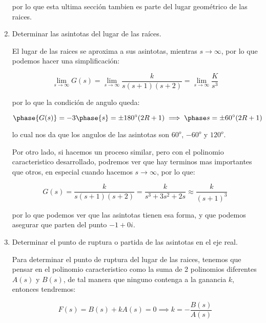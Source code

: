 \begin{enumerate}
		por lo que esta ultima sección tambien es parte del lugar geométrico de las raices.


		\item Determinar las asintotas del lugar de las raíces.

		El lugar de las raices se aproxima a sus asintotas, mientras $s \to \infty$, por lo que podemos hacer una simplificación:

		\begin{equation*}
			\lim_{s \to \infty} G(s) = \lim_{s \to \infty} \frac{k}{s(s+1)(s+2)} = \lim_{s \to \infty} \frac{K}{s^3}
		\end{equation*}

		por lo que la condición de angulo queda:

		\begin{equation*}
			\phase{G(s)} = -3 \phase{s} = \pm 180^{\circ} (2R + 1) \implies \phase s = \pm 60^{\circ} (2R + 1)
		\end{equation*}

		lo cual nos da que los angulos de las asintotas son $60^o$, $-60^o$ y $120^o$.

		Por otro lado, si hacemos un proceso similar, pero con el polinomio caracteristico desarrollado, podremos ver que hay terminos mas importantes que otros, en especial cuando hacemos $s \to \infty$, por lo que:

		\begin{equation*}
			G(s) = \frac{k}{s(s+1)(s+2)} = \frac{k}{s^3 + 3 s^2 + 2 s} \approx \frac{k}{(s+1)^3}
		\end{equation*}

		por lo que podemos ver que las asintotas tienen esa forma, y que podemos asegurar que parten del punto $-1 + 0 i$.


		\item Determinar el punto de ruptura o partida de las asintotas en el eje real.

		Para determinar el punto de ruptura del lugar de las raices, tenemos que pensar en el polinomio caracteristico como la suma de 2 polinomios diferentes $A(s)$ y $B(s)$, de tal manera que ninguno contenga a la ganancia $k$, entonces tendremos:

		\begin{equation*}
			F(s) = B(s) + k A(s) = 0 \implies k = - \frac{B(s)}{A(s)}
		\end{equation*}


\end{enumerate}
